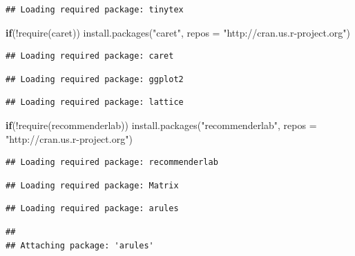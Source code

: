 \documentclass[
]{article}
\newenvironment{Shaded}{}{}
\newcommand{\AttributeTok}[1]{\textcolor[rgb]{0.49,0.56,0.16}{#1}}
\newcommand{\ControlFlowTok}[1]{\textcolor[rgb]{0.00,0.44,0.13}{\textbf{#1}}}
\newcommand{\FunctionTok}[1]{\textcolor[rgb]{0.02,0.16,0.49}{#1}}
\newcommand{\NormalTok}[1]{#1}
\newcommand{\SpecialCharTok}[1]{\textcolor[rgb]{0.25,0.44,0.63}{#1}}
\newcommand{\StringTok}[1]{\textcolor[rgb]{0.25,0.44,0.63}{#1}}
\begin{document}
\begin{verbatim}
## Loading required package: tinytex
\end{verbatim}

\begin{Shaded}
\begin{Highlighting}[]
\ControlFlowTok{if}\NormalTok{(}\SpecialCharTok{!}\FunctionTok{require}\NormalTok{(caret)) }\FunctionTok{install.packages}\NormalTok{(}\StringTok{"caret"}\NormalTok{, }
                                     \AttributeTok{repos =} \StringTok{"http://cran.us.r{-}project.org"}\NormalTok{)}
\end{Highlighting}
\end{Shaded}

\begin{verbatim}
## Loading required package: caret
\end{verbatim}

\begin{verbatim}
## Loading required package: ggplot2
\end{verbatim}

\begin{verbatim}
## Loading required package: lattice
\end{verbatim}

\begin{Shaded}
\begin{Highlighting}[]
\ControlFlowTok{if}\NormalTok{(}\SpecialCharTok{!}\FunctionTok{require}\NormalTok{(recommenderlab)) }\FunctionTok{install.packages}\NormalTok{(}\StringTok{"recommenderlab"}\NormalTok{, }
                                              \AttributeTok{repos =} \StringTok{"http://cran.us.r{-}project.org"}\NormalTok{)}
\end{Highlighting}
\end{Shaded}

\begin{verbatim}
## Loading required package: recommenderlab
\end{verbatim}

\begin{verbatim}
## Loading required package: Matrix
\end{verbatim}

\begin{verbatim}
## Loading required package: arules
\end{verbatim}

\begin{verbatim}
## 
## Attaching package: 'arules'
\end{verbatim}
\end{document}
